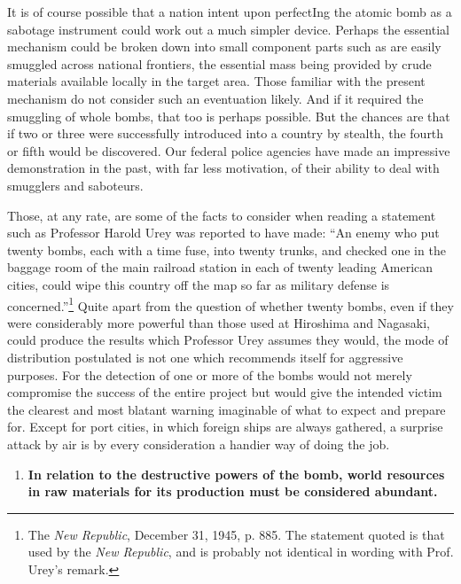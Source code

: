 It is of course possible that a nation intent upon perfectIng the atomic bomb as a sabotage instrument could work out a much simpler device. Perhaps the essential mechanism could be broken down into small component parts such as are easily smuggled across national frontiers, the essential mass being provided by crude materials available locally in the target area. Those familiar with the present mechanism do not consider such an eventuation likely. And if it required the smuggling of whole bombs, that too is perhaps possible. But the chances are that if two or three were successfully introduced into a country by stealth, the fourth or fifth would be discovered. Our federal police agencies have made an impressive demonstration in the past, with far less motivation, of their ability to deal with smugglers and saboteurs.

Those, at any rate, are some of the facts to consider when reading a statement such as Professor Harold Urey was reported to have made: ``An enemy who put twenty bombs, each with a time fuse, into twenty trunks, and checked one in the baggage room of the main railroad station in each of twenty leading American cities, could wipe this country off the map so far as military defense is concerned.''\footnote{The \textit{New Republic}, December 31, 1945, p. 885. The statement quoted is that used by the \textit{New Republic}, and is probably not identical in wording with Prof. Urey's remark.} Quite apart from the question of whether twenty bombs, even if they were considerably more powerful than those used at Hiroshima and Nagasaki, could produce the results which Professor Urey assumes they would, the mode of distribution postulated is not one which recommends itself for aggressive purposes. For the detection of one or more of the bombs would not merely compromise the success of the entire project but would give the intended victim the clearest and most blatant warning imaginable of what to expect and prepare for. Except for port cities, in which foreign ships are always gathered, a surprise attack by air is by every consideration a handier way of doing the job.

\begin{enumerate}[resume*]

\item \textbf{In relation to the destructive powers of the bomb, world resources in raw materials for its production must be considered abundant.}

\end{enumerate}

